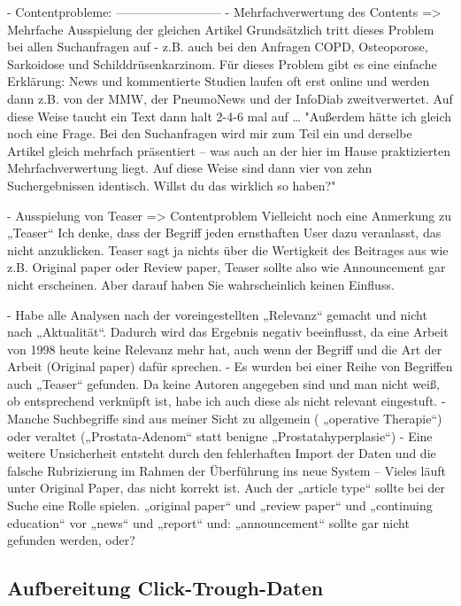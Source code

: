 - Contentprobleme:
--------------------------
- Mehrfachverwertung des Contents => Mehrfache Ausspielung der gleichen Artikel
		Grundsätzlich tritt dieses Problem bei allen Suchanfragen auf - z.B. auch bei den Anfragen COPD, Osteoporose, Sarkoidose und Schilddrüsenkarzinom.
		Für dieses Problem gibt es eine einfache Erklärung: News und kommentierte Studien laufen oft erst online und werden dann z.B. von der MMW, der PneumoNews und 
		der InfoDiab zweitverwertet. Auf diese Weise taucht ein Text dann halt 2-4-6 mal  auf …
		"Außerdem hätte ich gleich noch eine Frage. Bei den Suchanfragen wird mir zum Teil ein und derselbe Artikel gleich mehrfach präsentiert – was auch an der hier im 
		Hause praktizierten Mehrfachverwertung liegt. Auf diese Weise sind dann vier von zehn Suchergebnissen identisch. Willst du das wirklich so haben?"

- Ausspielung von Teaser => Contentproblem
	Vielleicht noch eine Anmerkung zu „Teaser“ Ich denke, dass der Begriff jeden ernsthaften User dazu veranlasst, das nicht anzuklicken. Teaser sagt ja nichts über die 	
	Wertigkeit des Beitrages aus wie z.B. Original paper oder Review paper, Teaser sollte also wie Announcement gar nicht erscheinen. Aber darauf haben Sie wahrscheinlich 
	keinen Einfluss.

-	Habe alle Analysen nach der voreingestellten „Relevanz“ gemacht und nicht nach „Aktualität“. Dadurch wird das Ergebnis negativ beeinflusst, da eine Arbeit von 1998 
		heute keine Relevanz mehr hat, auch wenn der Begriff und die Art der Arbeit (Original paper) dafür sprechen.
-  Es wurden bei einer Reihe von Begriffen auch „Teaser“ gefunden. Da keine Autoren angegeben sind und man nicht weiß, ob entsprechend verknüpft ist, habe ich auch 
		diese als nicht relevant eingestuft.
-	Manche Suchbegriffe sind aus meiner Sicht zu allgemein ( „operative Therapie“) oder veraltet („Prostata-Adenom“ statt benigne „Prostatahyperplasie“)
-	Eine weitere Unsicherheit entsteht durch den fehlerhaften Import der Daten und die falsche Rubrizierung im Rahmen der Überführung ins neue System – Vieles läuft unter 
	Original Paper, das nicht korrekt ist. Auch der „article type“ sollte bei der Suche eine Rolle spielen. „original paper“ und „review paper“ und „continuing education“ vor 
	„news“ und „report“  und: „announcement“ sollte gar nicht gefunden werden, oder?  
	

\subsection{Aufbereitung Click-Trough-Daten}
\label{sec:Reranking:Prozessaufbau:Click-Trough-Daten}

